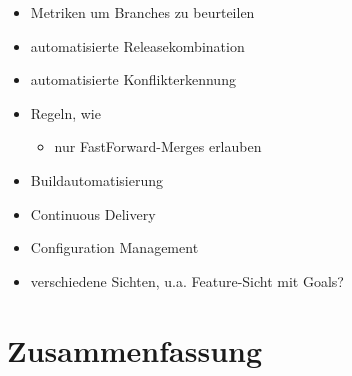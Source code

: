 \documentclass[10pt,a4paper]{book}
\begin{document}
\begin{itemize}
\item Metriken um Branches zu beurteilen
\item automatisierte Releasekombination
\item automatisierte Konflikterkennung
\item Regeln, wie 
	\begin{itemize}
		\item nur FastForward-Merges erlauben
	\end{itemize}	 
\item Buildautomatisierung
\item Continuous Delivery
\item Configuration Management
\item verschiedene Sichten, u.a. Feature-Sicht mit Goals?
\end{itemize}

\chapter{Zusammenfassung}
\end{document}
